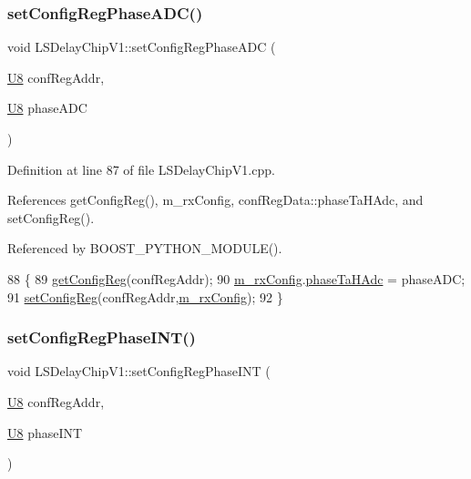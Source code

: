 \subsubsection{\texorpdfstring{set\+Config\+Reg\+Phase\+A\+D\+C()}{setConfigRegPhaseADC()}}
{\footnotesize\ttfamily void L\+S\+Delay\+Chip\+V1\+::set\+Config\+Reg\+Phase\+A\+DC (\begin{DoxyParamCaption}\item[{\hyperlink{ICECALv3_8h_a3cb25ca6f51f003950f9625ff05536fc}{U8}}]{conf\+Reg\+Addr,  }\item[{\hyperlink{ICECALv3_8h_a3cb25ca6f51f003950f9625ff05536fc}{U8}}]{phase\+A\+DC }\end{DoxyParamCaption})}



Definition at line 87 of file L\+S\+Delay\+Chip\+V1.\+cpp.



References get\+Config\+Reg(), m\+\_\+rx\+Config, conf\+Reg\+Data\+::phase\+Ta\+H\+Adc, and set\+Config\+Reg().



Referenced by B\+O\+O\+S\+T\+\_\+\+P\+Y\+T\+H\+O\+N\+\_\+\+M\+O\+D\+U\+L\+E().


\begin{DoxyCode}
88 \{
89     \hyperlink{classLSDelayChipV1_a4f338071d49df7eae55020a5f5fa8474}{getConfigReg}(confRegAddr);
90     \hyperlink{classLSDelayChipV1_a4818ac5c0d7ccf2845a01226234bdb67}{m\_rxConfig}.\hyperlink{structconfRegData_a2e471f30b32e57270cb2edb0e420cf1b}{phaseTaHAdc} = phaseADC;
91     \hyperlink{classLSDelayChipV1_a11fa2ebfa37c5cf0544ddb68c7d43e94}{setConfigReg}(confRegAddr,\hyperlink{classLSDelayChipV1_a4818ac5c0d7ccf2845a01226234bdb67}{m\_rxConfig});
92 \}
\end{DoxyCode}
\mbox{\label{classLSDelayChipV1_a317f739744d1093385306530fe5b312a}} 
\subsubsection{\texorpdfstring{set\+Config\+Reg\+Phase\+I\+N\+T()}{setConfigRegPhaseINT()}}
{\footnotesize\ttfamily void L\+S\+Delay\+Chip\+V1\+::set\+Config\+Reg\+Phase\+I\+NT (\begin{DoxyParamCaption}\item[{\hyperlink{ICECALv3_8h_a3cb25ca6f51f003950f9625ff05536fc}{U8}}]{conf\+Reg\+Addr,  }\item[{\hyperlink{ICECALv3_8h_a3cb25ca6f51f003950f9625ff05536fc}{U8}}]{phase\+I\+NT }\end{DoxyParamCaption})}




